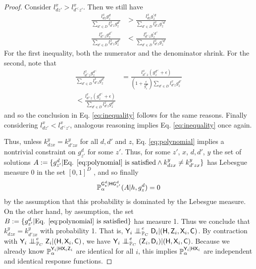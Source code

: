 \begin{proof}
Consider $l^x_{dz'}> l^x_{d^<z'}$. Then we still have
\begin{align}
    \frac{l^x_{dz}g^d_z}{\sum_{d'\in D}l^x_{d'z}g^{d'}_z} &> \frac{l^x_{dz}g^{\prime d}_z}{\sum_{d'\in D}l^x_{d'z}g^{\prime d'}_z}\\
    \frac{l^x_{d^<z}g^{d^<}_z}{\sum_{d'\in D}l^x_{d'z}g^{d'}_z} &< \frac{l^x_{d^<z}g^{\prime d^<}_z}{\sum_{d'\in D}l^x_{d'z}g^{\prime d'}_z}
\end{align}
For the first inequality, both the numerator and the denominator shrink. For the second, note that
\begin{align}
    \frac{l^x_{d^<z}g^{d^<}_z}{\sum_{d'\in D}l^x_{d'z}g^{d'}_z} &= \frac{l^x_{d^<z}(g^{d^<}_z+\epsilon)}{(1+\frac{\epsilon}{g^{d'}_z})\sum_{d'\in D}l^x_{d'z}g^{d'}_z}\\
    < \frac{l^x_{d^<z}(g^{d^<}_z+\epsilon)}{\sum_{d'\in D}l^x_{d'z}g^{d'}_z}
\end{align}
and so the conclusion in Eq. \eqref{eq:inequality} follows for the same reasons. Finally considering $l^x_{dz'}< l^x_{d^<z'}$, analogous reasoning implies Eq. \eqref{eq:inequality} once again.

Thus, unless $k^y_{dzx}=k^y_{d'zx}$ for all $d,d'$ and $z$, Eq. \eqref{eq:polynomial} implies a nontrivial constraint on  $g^d_{z'}$ for some $z'$. Thus, for some $z'$, $x$, $d,d'$, $y$ the set of solutions $A:=\{g^d_{z'}|\text{Eq. \eqref{eq:polynomial} is satisfied}\land k^y_{dzx}\neq k^y_{d'zx}\}$ has Lebesgue measure 0 in the set $[0,1]^{D}$ \citep{okamoto_distinctness_1973}, and so finally
\begin{align}
    \mathbb{P}_\alpha^{\mathsf{G}^d_{z}|\mathsf{H}\mathsf{G}^d_{z'}}(A|h,g^d_{z}) = 0
\end{align}
by the assumption that this probability is dominated by the Lebesgue measure. On the other hand, by assumption, the set $B:=\{g^d_{z'}|\text{Eq. \eqref{eq:polynomial} is satisfied}\}$ has measure 1. Thus we conclude that $k^y_{dzx}=k^y_{d'zx}$ with probability 1. That is, $\RV{Y}_i\CI_{\prob{P}_C}^e \RV{D}_i|(\RV{H},\RV{Z}_i,\RV{X}_i,\RV{C})$. By contraction with $\RV{Y}_i\CI^e_{\prob{P}_C} \RV{Z}_i|(\RV{H},\RV{X}_i,\RV{C})$, we have $\RV{Y}_i\CI^e_{\prob{P}_C} (\RV{Z}_i,\RV{D}_i)|(\RV{H},\RV{X}_i,\RV{C})$. Because we already know $\mathbb{P}_\alpha^{\mathsf{Y}_i|\mathsf{H}\mathsf{X}_i\mathsf{Z}_i}$ are identical for all $i$, this implies $\mathbb{P}_\alpha^{\mathsf{Y}_i|\mathsf{H}\mathsf{X}_i}$ are independent and identical response functions.
\end{proof}

